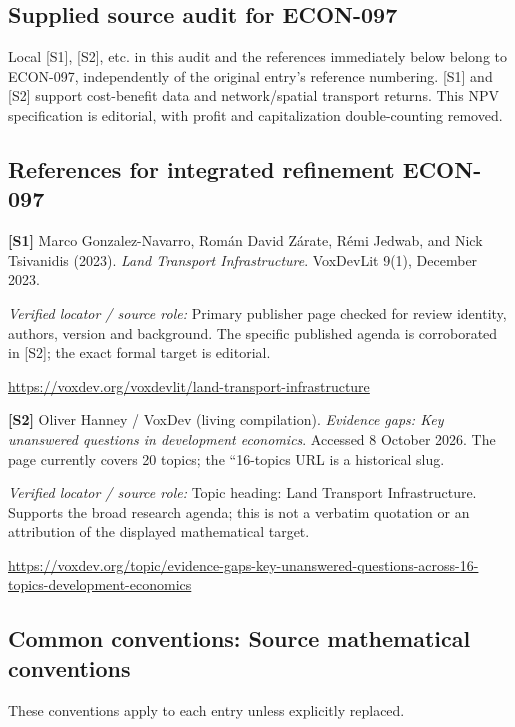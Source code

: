 \documentclass[11pt,a4paper]{article}
\begin{document}
\subsection*{Supplied source audit for ECON-097}
Local [S1], [S2], etc. in this audit and the references immediately below
belong to ECON-097, independently of the original entry's reference numbering.
[S1] and [S2] support cost-benefit data and network/spatial transport returns. This NPV specification is editorial, with profit and capitalization double-counting removed.
\subsection*{References for integrated refinement ECON-097}
{\footnotesize\raggedright
\par\noindent\textbf{[S1]} Marco Gonzalez-Navarro, Román David Zárate, Rémi Jedwab, and Nick Tsivanidis (2023). \emph{Land Transport Infrastructure}. VoxDevLit 9(1), December 2023.\par \textit{Verified locator / source role:} Primary publisher page checked for review identity, authors, version and background. The specific published agenda is corroborated in [S2]; the exact formal target is editorial.\par \url{https://voxdev.org/voxdevlit/land-transport-infrastructure}\par\smallskip
\par\noindent\textbf{[S2]} Oliver Hanney / VoxDev (living compilation). \emph{Evidence gaps: Key unanswered questions in development economics}. Accessed 8 October 2026. The page currently covers 20 topics; the ``16-topics URL is a historical slug.\par \textit{Verified locator / source role:} Topic heading: Land Transport Infrastructure. Supports the broad research agenda; this is not a verbatim quotation or an attribution of the displayed mathematical target.\par \url{https://voxdev.org/topic/evidence-gaps-key-unanswered-questions-across-16-topics-development-economics}\par\smallskip
}

\subsection*{Common conventions: Source mathematical conventions}

These conventions apply to each entry unless explicitly replaced.
\end{document}

